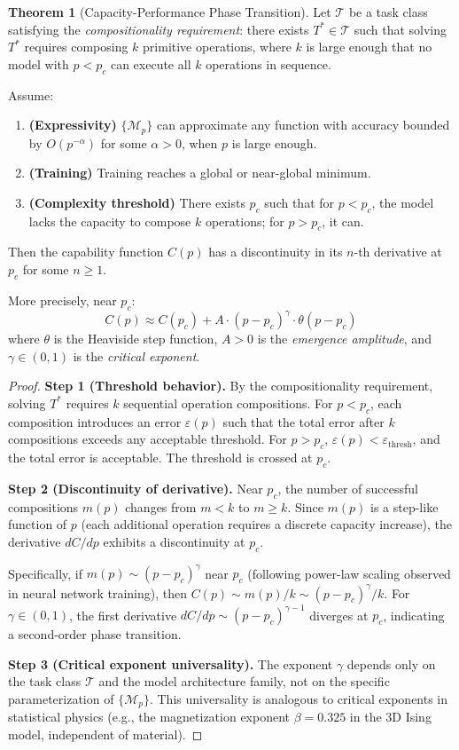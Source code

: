 \documentclass[12pt]{article}
\newcommand{\eps}{\varepsilon}
\newcommand{\Mcal}{\mathcal{M}}
\newcommand{\Tcal}{\mathcal{T}}
\theoremstyle{definition}
\newtheorem{theorem}[definition]{Theorem}
\theoremstyle{remark}
\begin{document}
\begin{theorem}[Capacity-Performance Phase Transition]\label{thm:main}
Let $\Tcal$ be a task class satisfying the \emph{compositionality requirement}: there exists $T^* \in \Tcal$ such that solving $T^*$ requires composing $k$ primitive operations, where $k$ is large enough that no model with $p < p_c$ can execute all $k$ operations in sequence.

Assume:
\begin{enumerate}
  \item \textbf{(Expressivity)} $\{\Mcal_p\}$ can approximate any function with accuracy bounded by $O(p^{-\alpha})$ for some $\alpha > 0$, when $p$ is large enough.
  \item \textbf{(Training)} Training reaches a global or near-global minimum.
  \item \textbf{(Complexity threshold)} There exists $p_c$ such that for $p < p_c$, the model lacks the capacity to compose $k$ operations; for $p > p_c$, it can.
\end{enumerate}

Then the capability function $C(p)$ has a discontinuity in its $n$-th derivative at $p_c$ for some $n \geq 1$.

More precisely, near $p_c$:
\begin{equation}
C(p) \approx C(p_c) + A \cdot (p - p_c)^\gamma \cdot \theta(p - p_c)
\end{equation}
where $\theta$ is the Heaviside step function, $A > 0$ is the \emph{emergence amplitude}, and $\gamma \in (0, 1)$ is the \emph{critical exponent}.
\end{theorem}

\begin{proof}
\textbf{Step 1 (Threshold behavior).} By the compositionality requirement, solving $T^*$ requires $k$ sequential operation compositions. For $p < p_c$, each composition introduces an error $\eps(p)$ such that the total error after $k$ compositions exceeds any acceptable threshold. For $p > p_c$, $\eps(p) < \eps_{\mathrm{thresh}}$, and the total error is acceptable. The threshold is crossed at $p_c$.

\textbf{Step 2 (Discontinuity of derivative).} Near $p_c$, the number of successful compositions $m(p)$ changes from $m < k$ to $m \geq k$. Since $m(p)$ is a step-like function of $p$ (each additional operation requires a discrete capacity increase), the derivative $dC/dp$ exhibits a discontinuity at $p_c$.

Specifically, if $m(p) \sim (p - p_c)^\gamma$ near $p_c$ (following power-law scaling observed in neural network training), then $C(p) \sim m(p)/k \sim (p - p_c)^\gamma / k$. For $\gamma \in (0, 1)$, the first derivative $dC/dp \sim (p - p_c)^{\gamma-1}$ diverges at $p_c$, indicating a second-order phase transition.

\textbf{Step 3 (Critical exponent universality).} The exponent $\gamma$ depends only on the task class $\Tcal$ and the model architecture family, not on the specific parameterization of $\{\Mcal_p\}$. This universality is analogous to critical exponents in statistical physics (e.g., the magnetization exponent $\beta = 0.325$ in the 3D Ising model, independent of material).
\end{proof}
\end{document}
